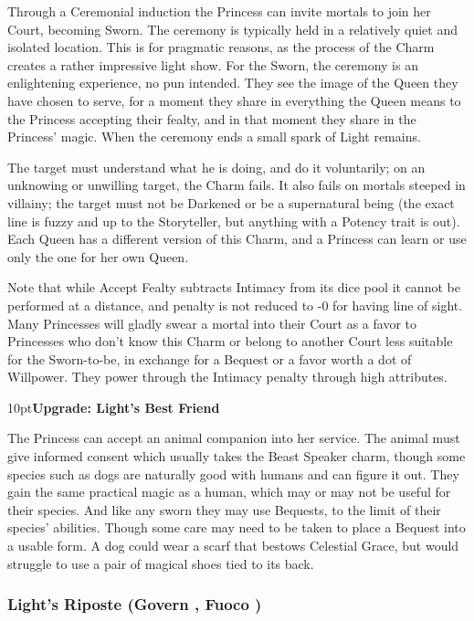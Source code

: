 \noindent Through a Ceremonial induction the Princess can invite mortals to join her Court, becoming Sworn. The ceremony is typically held in a relatively quiet and isolated location. This is for pragmatic reasons, as the process of the Charm creates a rather impressive light show. For the Sworn, the ceremony is an enlightening experience, no pun intended. They see the image of the Queen they have chosen to serve, for a moment they share in everything the Queen means to the Princess accepting their fealty, and in that moment they share in the Princess' magic. When the ceremony ends a small spark of Light remains.

The target must understand what he is doing, and do it voluntarily; on an unknowing or unwilling target, the Charm fails. It also fails on mortals steeped in villainy; the target must not be Darkened or be a supernatural being (the exact line is fuzzy and up to the Storyteller, but anything with a Potency trait is out). Each Queen has a different version of this Charm, and a Princess can learn or use only the one for her own Queen.

Note that while Accept Fealty subtracts Intimacy from its dice pool it cannot be performed at a distance, and penalty is not reduced to -0 for having line of sight. Many Princesses will gladly swear a mortal into their Court as a favor to Princesses who don't know this Charm or belong to another Court less suitable for the Sworn-to-be, in exchange for a Bequest or a favor worth a dot of Willpower. They power through the Intimacy penalty through high attributes. 

\begin{myindentpar}{10pt}\textbf{Upgrade: Light's Best Friend}

The Princess can accept an animal companion into her service. The animal must give informed consent which usually takes the Beast Speaker charm, though some species such as dogs are naturally good with humans and can figure it out. They gain the same practical magic as a human, which may or may not be useful for their species. And like any sworn they may use Bequests, to the limit of their species' abilities. Though some care may need to be taken to place a Bequest into a usable form. A dog could wear a scarf that bestows Celestial Grace, but would struggle to use a pair of magical shoes tied to its back.

\end{myindentpar}


\subsubsection*{Light's Riposte (Govern \textbullet\textbullet, Fuoco \textbullet)}

